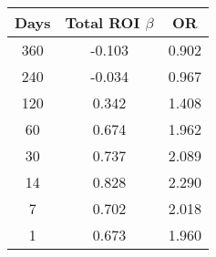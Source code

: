 \begin{tabular}{||c c c||}
\hline
Days & Total ROI $\beta$ & OR \\
\hline\hline
360 & -0.103 & 0.902 \\
240 & -0.034 & 0.967 \\
120 & 0.342 & 1.408 \\
60 & 0.674 & 1.962 \\
30 & 0.737 & 2.089 \\
14 & 0.828 & 2.290 \\
7 & 0.702 & 2.018 \\
1 & 0.673 & 1.960 \\
\hline
\end{tabular}
